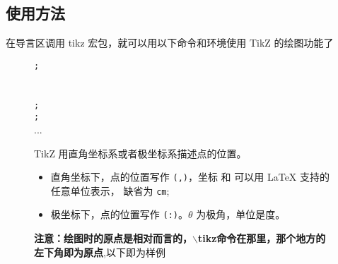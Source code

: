 \documentclass[fontset=windows]{article}
\begin{document}
\subsection{使用方法}

在导言区调用 tikz 宏包，就可以用以下命令和环境使用 TikZ 的绘图功能了
\begin{figure}[!htb]
    \begin{minipage}[t]{0.5\linewidth}
        \vspace*{0pt}
        \begin{command}
             \texttt{;} \\[1ex]
              \\[1ex]
             \\
            \texttt{;} \\
            \texttt{;} \\
            ... \\
        \end{command}
    \end{minipage}
    \begin{minipage}[t]{0.5\linewidth}
        \vspace*{0pt}
        {TikZ} 用直角坐标系或者极坐标系描述点的位置。
        \begin{itemize}
        \item 直角坐标下，点的位置写作 \texttt{(,)}，坐标  和  可以用 \LaTeX{} 支持的任意单位表示，
        缺省为 \texttt{cm};
        \item 极坐标下，点的位置写作 \texttt{(\Arg{$\theta$}:)}。$\theta$ 为极角，单位是度。
        \end{itemize}
        \textbf{注意：绘图时的原点是相对而言的，$\backslash$tikz命令在那里，那个地方的左下角即为原点},以下即为样例
    \end{minipage}
\end{figure}
\end{document}
